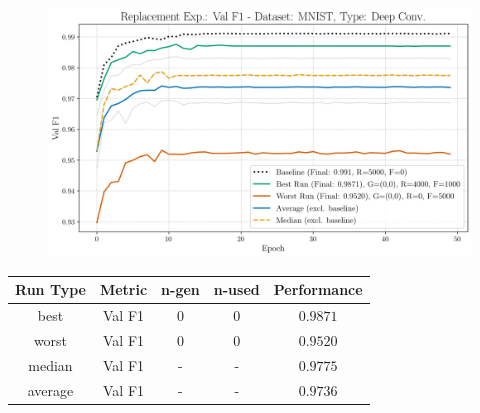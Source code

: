 \begin{figure}[htbp]
	\centering
	\includegraphics[width=.85\textwidth]{abb/strat_classifier_performance/MNIST_STRATIFIED_CLASSIFIERS_VANILLA_GAN/replacement_experiments/val_f1_score_['VANILLA']_MNIST_all.png}
	\label{fig:app_strat_class_performance_replacement_exp._val_f1_score_}
\end{figure}
\begin{table}[H]
	\centering
	\vspace{-1em}
	\begin{tabular}{|c|c|c|c|c|}
		\hline
		Run Type & Metric & n-gen & n-used & Performance \\ \hline
		best & Val F1 & 0 & 0 & $0.9871$\\ \hline
		worst & Val F1 & 0 & 0 & $0.9520$\\ \hline
		median & Val F1 & - & - & $0.9775$\\ \hline
		average & Val F1 & - & - & $0.9736$
		\\ \hline
	\end{tabular}
\end{table}
\newpage
